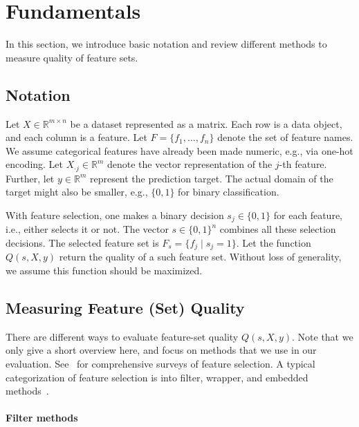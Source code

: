 \documentclass[conference]{IEEEtran}
\theoremstyle{definition}
\begin{document}
\section{Fundamentals}
\label{sec:fundamentals}

In this section, we introduce basic notation and review different methods to measure quality of feature sets.

\subsection{Notation}
\label{sec:fundamentals:notation}

Let $X \in \mathbb{R}^{m \times n}$ be a dataset represented as a matrix.
Each row is a data object, and each column is a feature.
Let $F = \{f_1, \dots, f_n\}$ denote the set of feature names.
We assume categorical features have already been made numeric, e.g., via one-hot encoding.
Let $X_{\cdot{}j} \in \mathbb{R}^m$ denote the vector representation of the $j$-th feature.
Further, let $y \in \mathbb{R}^m$ represent the prediction target.
The actual domain of the target might also be smaller, e.g., $\{0,1\}$ for binary classification.

With feature selection, one makes a binary decision $s_j \in \{0,1\}$ for each feature, i.e., either selects it or not.
The vector $s \in \{0,1\}^n$ combines all these selection decisions.
The selected feature set is $F_s = \{f_j \mid s_j=1\}$.
Let the function $Q(s,X,y)$ return the quality of a such feature set.
Without loss of generality, we assume this function should be maximized.

\subsection{Measuring Feature (Set) Quality}
\label{sec:fundamentals:quality}

There are different ways to evaluate feature-set quality $Q(s,X,y)$.
Note that we only give a short overview here, and focus on methods that we use in our evaluation.
See~\cite{chandrashekar2014survey,li2017feature} for comprehensive surveys of feature selection.
A typical categorization of feature selection is into filter, wrapper, and embedded methods~\cite{guyon2003introduction}.

\paragraph{Filter methods}
\end{document}
